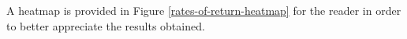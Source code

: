 \documentclass[a4paper,twoside]{article}
\begin{document}
A heatmap is provided in Figure \ref{rates-of-return-heatmap} for the reader in order to better appreciate the results obtained.



  
\end{document}

